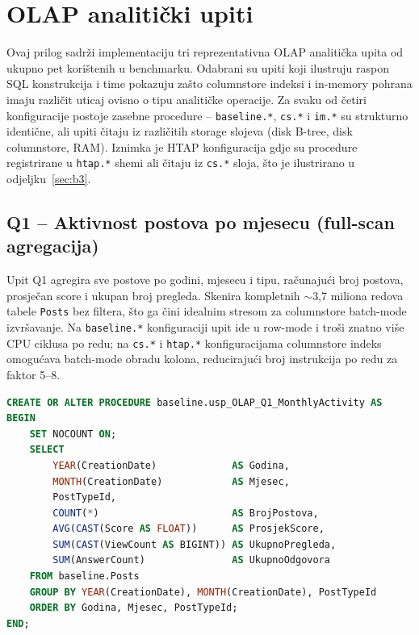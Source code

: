 \chapter{OLAP analitički upiti}
\label{app:olap}

Ovaj prilog sadrži implementaciju tri reprezentativna OLAP analitička upita od ukupno pet korištenih u benchmarku. Odabrani su upiti koji ilustruju raspon SQL konstrukcija i time pokazuju zašto columnstore indeksi i in-memory pohrana imaju različit uticaj ovisno o tipu analitičke operacije. Za svaku od četiri konfiguracije postoje zasebne procedure -- \texttt{baseline.*}, \texttt{cs.*} i \texttt{im.*} su strukturno identične, ali upiti čitaju iz različitih storage slojeva (disk B-tree, disk columnstore, RAM). Iznimka je HTAP konfiguracija gdje su procedure registrirane u \texttt{htap.*} shemi ali čitaju iz \texttt{cs.*} sloja, što je ilustrirano u odjeljku~\ref{sec:b3}.

\section{Q1 -- Aktivnost postova po mjesecu (full-scan agregacija)}

Upit Q1 agregira sve postove po godini, mjesecu i tipu, računajući broj postova, prosječan score i ukupan broj pregleda. Skenira kompletnih $\sim$3,7 miliona redova tabele \texttt{Posts} bez filtera, što ga čini idealnim stresom za columnstore batch-mode izvršavanje. Na \texttt{baseline.*} konfiguraciji upit ide u row-mode i troši znatno više CPU ciklusa po redu; na \texttt{cs.*} i \texttt{htap.*} konfiguracijama columnstore indeks omogućava batch-mode obradu kolona, reducirajući broj instrukcija po redu za faktor 5--8.

\begin{lstlisting}[language=SQL, caption={baseline.usp\_OLAP\_Q1\_MonthlyActivity -- GROUP BY full-scan nad $\sim$3,7M redova}, label=lst:b1]
CREATE OR ALTER PROCEDURE baseline.usp_OLAP_Q1_MonthlyActivity AS
BEGIN
    SET NOCOUNT ON;
    SELECT
        YEAR(CreationDate)             AS Godina,
        MONTH(CreationDate)            AS Mjesec,
        PostTypeId,
        COUNT(*)                       AS BrojPostova,
        AVG(CAST(Score AS FLOAT))      AS ProsjekScore,
        SUM(CAST(ViewCount AS BIGINT)) AS UkupnoPregleda,
        SUM(AnswerCount)               AS UkupnoOdgovora
    FROM baseline.Posts
    GROUP BY YEAR(CreationDate), MONTH(CreationDate), PostTypeId
    ORDER BY Godina, Mjesec, PostTypeId;
END;
\end{lstlisting}

